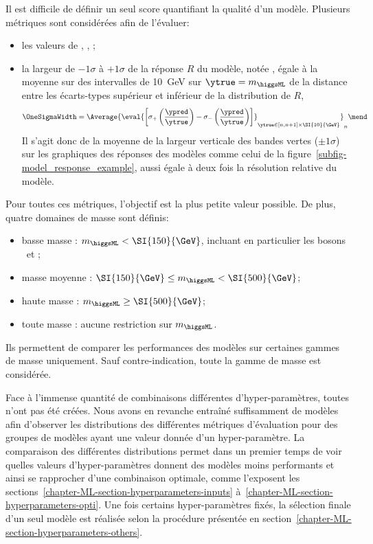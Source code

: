 Il est difficile de définir un seul score quantifiant la qualité d'un modèle.
Plusieurs métriques sont considérées afin de l'évaluer:
\begin{itemize}
\item les valeurs de
\LossMSE,
\LossMAE,
\LossMAPE;
\item la largeur de $-1\sigma$ à $+1\sigma$ de la réponse $R$ du modèle,
notée \OneSigmaWidth,
égale à
la moyenne
sur des intervalles de \SI{10}{\GeV} sur $\ytrue=m_{\higgsML}$
de
la distance entre
les écarts-types supérieur et inférieur
de la distribution de $R$,
\ie
\begin{equation}
\OneSigmaWidth = \Average{\eval{\left[\sigma_+\left(\frac{\ypred}{\ytrue}\right)-\sigma_-\left(\frac{\ypred}{\ytrue}\right)\right]}_{\ytrue\in [n, n+1]\times\SI{10}{\GeV}}}_n
\mend
\end{equation}
Il s'agit donc de la moyenne de la largeur verticale des bandes vertes ($\pm1\sigma$) sur les graphiques des réponses des modèles comme celui de la figure~\ref{subfig-model_response_example},
aussi égale à deux fois la résolution relative du modèle.
\end{itemize}
Pour toutes ces métriques, l'objectif est la plus petite valeur possible.
De plus, quatre domaines de masse sont définis:
\begin{itemize}
\item basse masse : $m_{\higgsML} < \SI{150}{\GeV}$, incluant en particulier les bosons \Zboson\ et \higgs;
\item masse moyenne : $\SI{150}{\GeV} \leq m_{\higgsML} < \SI{500}{\GeV}$;
\item haute masse : $m_{\higgsML} \geq \SI{500}{\GeV}$;
\item toute masse : aucune restriction sur $m_{\higgsML}$.
\end{itemize}
Ils permettent de comparer les performances des modèles sur certaines gammes de masse uniquement.
Sauf contre-indication, toute la gamme de masse est considérée.
\par
Face à l'immense quantité de combinaisons différentes d'hyper-paramètres, toutes n'ont pas été créées.
Nous avons en revanche entraîné suffisamment de modèles afin d'observer les distributions des différentes métriques d'évaluation
pour des groupes de modèles ayant une valeur donnée d'un hyper-paramètre.
La comparaison des différentes distributions permet dans un premier temps de
voir quelles valeurs d'hyper-paramètres donnent des modèles moins performants
et ainsi se rapprocher d'une combinaison optimale,
comme l'exposent les sections~\ref{chapter-ML-section-hyperparameters-inputs} à~\ref{chapter-ML-section-hyperparameters-opti}.
Une fois certains hyper-paramètres fixés,
la sélection finale d'un seul modèle est réalisée selon la procédure
présentée en section~\ref{chapter-ML-section-hyperparameters-others}.

